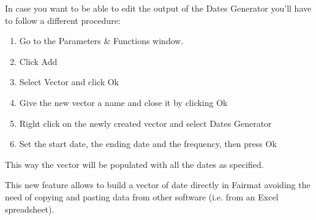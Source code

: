 In case you want to be able to edit the output of the Dates Generator you'll have to follow a different procedure:
\begin{enumerate}
\item Go to the Parameters \& Functions window.
\item Click Add
\item Select Vector and click Ok
\item Give the new vector a name and close it by clicking Ok
\item Right click on the newly created vector and select Dates Generator
\item Set the start date, the ending date and the frequency, then press Ok
\end{enumerate}

This way the vector will be populated with all the dates as specified.



This new feature allows to build a vector of date directly in Fairmat avoiding the 
need of copying and pasting data from other software (i.e. from an Excel spreadsheet).


